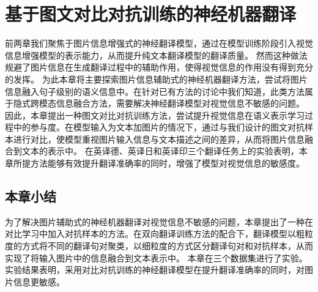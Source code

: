 \chapter{基于图文对比对抗训练的神经机器翻译}
前两章我们聚焦于图片信息增强式的神经翻译模型，通过在模型训练阶段引入视觉信息增强模型的表示能力，从而提升纯文本翻译模型的翻译质量。
然而这种做法规避了图片信息在生成翻译过程中的辅助作用，使得视觉信息的作用没有得到充分的发挥。
为此本章将主要探索图片信息辅助式的神经机器翻译方法，尝试将图片信息融入句子级别的语义信息中。在针对已有方法的讨论中我们知道，此类方法属于隐式跨模态信息融合方法，需要解决神经翻译模型对视觉信息不敏感的问题。
因此，本章提出一种图文对比对抗训练方法，尝试提升视觉信息在语义表示学习过程中的参与度。在模型输入为文本加图片的情况下，通过与我们设计的图文对抗样本进行对比，使模型重视图片输入信息与文本描述之间的差异，从而将图片信息融合到文本的表示中。
在英译德、英译日和英译印三个翻译任务上的实验表明，本章所提方法能够有效提升翻译准确率的同时，增强了模型对视觉信息的敏感度。







\section{本章小结}
为了解决图片辅助式的神经机器翻译对视觉信息不敏感的问题，本章提出了一种在对比学习中加入对抗样本的方法。在双向翻译训练方法的配合下，翻译模型以粗粒度的方式将不同的翻译句对聚类，以细粒度的方式区分翻译句对和对抗样本，从而实现了将输入图片中的信息融合到文本表示中。
本章在三个数据集进行了实验。实验结果表明，采用对比对抗训练的神经翻译模型在提升翻译准确率的同时，对图片信息更敏感。